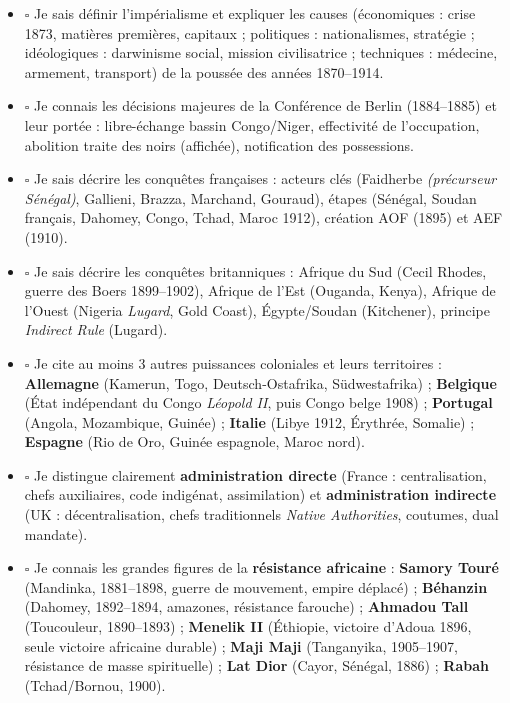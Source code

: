 \documentclass[11pt]{article}
\begin{document}
\begin{aretenir}
\begin{itemize}
  \item $\square$ Je sais définir l'impérialisme et expliquer les causes (économiques : crise 1873, matières premières, capitaux ; politiques : nationalismes, stratégie ; idéologiques : darwinisme social, mission civilisatrice ; techniques : médecine, armement, transport) de la poussée des années 1870--1914.
  \item $\square$ Je connais les décisions majeures de la Conférence de Berlin (1884--1885) et leur portée : libre-échange bassin Congo/Niger, effectivité de l'occupation, abolition traite des noirs (affichée), notification des possessions.
  \item $\square$ Je sais décrire les conquêtes françaises : acteurs clés (Faidherbe \emph{(précurseur Sénégal)}, Gallieni, Brazza, Marchand, Gouraud), étapes (Sénégal, Soudan français, Dahomey, Congo, Tchad, Maroc 1912), création AOF (1895) et AEF (1910).
  \item $\square$ Je sais décrire les conquêtes britanniques : Afrique du Sud (Cecil Rhodes, guerre des Boers 1899--1902), Afrique de l'Est (Ouganda, Kenya), Afrique de l'Ouest (Nigeria \emph{Lugard}, Gold Coast), Égypte/Soudan (Kitchener), principe \emph{Indirect Rule} (Lugard).
  \item $\square$ Je cite au moins 3 autres puissances coloniales et leurs territoires : \textbf{Allemagne} (Kamerun, Togo, Deutsch-Ostafrika, Südwestafrika) ; \textbf{Belgique} (État indépendant du Congo \emph{Léopold II}, puis Congo belge 1908) ; \textbf{Portugal} (Angola, Mozambique, Guinée) ; \textbf{Italie} (Libye 1912, Érythrée, Somalie) ; \textbf{Espagne} (Rio de Oro, Guinée espagnole, Maroc nord).
  \item $\square$ Je distingue clairement \textbf{administration directe} (France : centralisation, chefs auxiliaires, code indigénat, assimilation) et \textbf{administration indirecte} (UK : décentralisation, chefs traditionnels \emph{Native Authorities}, coutumes, dual mandate).
  \item $\square$ Je connais les grandes figures de la \textbf{résistance africaine} : \textbf{Samory Touré} (Mandinka, 1881--1898, guerre de mouvement, empire déplacé) ; \textbf{Béhanzin} (Dahomey, 1892--1894, amazones, résistance farouche) ; \textbf{Ahmadou Tall} (Toucouleur, 1890--1893) ; \textbf{Menelik II} (Éthiopie, victoire d'Adoua 1896, seule victoire africaine durable) ; \textbf{Maji Maji} (Tanganyika, 1905--1907, résistance de masse spirituelle) ; \textbf{Lat Dior} (Cayor, Sénégal, 1886) ; \textbf{Rabah} (Tchad/Bornou, 1900).

\end{itemize}
\end{aretenir}
\end{document}
